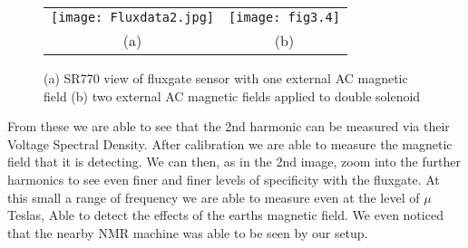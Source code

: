 \documentclass[../main.tex]{subfiles}
\begin{document}
\begin{figure}[ht]
    \centering
    \begin{tabular}{cc}
        \texttt{[image: Fluxdata2.jpg]} &
        \texttt{[image: fig3.4]} \\
        (a) & (b)
    \end{tabular}
    \caption{(a) SR770 view of fluxgate sensor with one external AC magnetic field (b) two external AC magnetic fields applied to double solenoid}
    \label{fig:exp3_2}
\end{figure}
From these we are able to see that the 2nd harmonic can be measured via their Voltage Spectral Density. After calibration we are able to measure the magnetic field that it is detecting. We can then, as in the 2nd image, zoom into the further harmonics to see even finer and finer levels of specificity with the fluxgate. At this small a range of frequency we are able to measure even at the level of $\mu$ Teslas, Able to detect the effects of the earths magnetic field. We even noticed that the nearby NMR machine was able to be seen by our setup.
\end{document}
